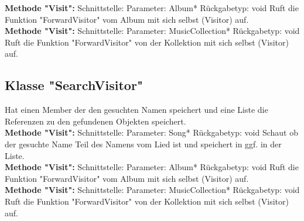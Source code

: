 \documentclass[12pt,a4paper]{article}
\begin{document}
\textbf {Methode "Visit": } 
\newline
Schnittstelle: 
\newline
Parameter: Album*
\newline
Rückgabetyp: void
\newline
Ruft die Funktion "ForwardVisitor" vom Album mit sich selbst (Visitor) auf.
\\

\textbf {Methode "Visit": } 
\newline
Schnittstelle: 
\newline
Parameter: MusicCollection*
\newline
Rückgabetyp: void
\newline
Ruft die Funktion "ForwardVisitor" von der Kollektion mit sich selbst (Visitor) auf.
\\

\subsection {Klasse "SearchVisitor"}
Hat einen Member der den gesuchten Namen speichert und eine Liste die Referenzen zu den gefundenen Objekten speichert.
\\

\textbf {Methode "Visit": } 
\newline
Schnittstelle: 
\newline
Parameter: Song*
\newline
Rückgabetyp: void
\newline
Schaut ob der gesuchte Name Teil des Namens vom Lied ist und speichert in ggf. in der Liste.
\\

\textbf {Methode "Visit": } 
\newline
Schnittstelle: 
\newline
Parameter: Album*
\newline
Rückgabetyp: void
\newline
Ruft die Funktion "ForwardVisitor" vom Album mit sich selbst (Visitor) auf.
\\

\textbf {Methode "Visit": } 
\newline
Schnittstelle: 
\newline
Parameter: MusicCollection*
\newline
Rückgabetyp: void
\newline
Ruft die Funktion "ForwardVisitor" von der Kollektion mit sich selbst (Visitor) auf.
\\
\end{document}
